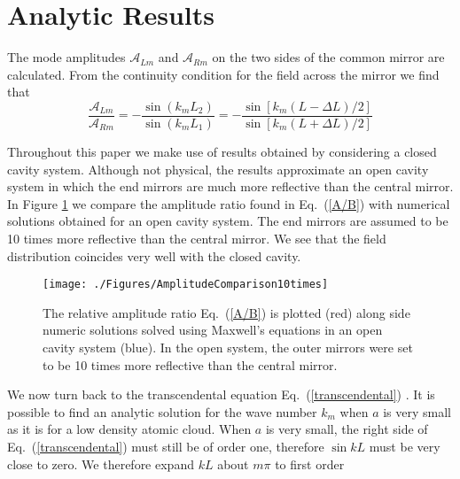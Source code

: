 \section{Analytic Results}
\label{sec:AnalyticExpressions}



The mode amplitudes $\mathcal{A}_{Lm}$ and $\mathcal{A}_{Rm}$ on the two sides of the common mirror are calculated.  From the continuity condition for the field across the mirror we find that   
\begin{equation}
\frac{\mathcal{A}_{Lm}}{\mathcal{A}_{Rm}}=-\frac{\sin(k_{m}L_{2})}{\sin(k_{m}L_{1})} = -\frac{\sin [k_{m} (L-\Delta L)/2]}{\sin[k_{m}(L+\Delta L)/2]} 
\label{A/B} 
\end{equation}

Throughout this paper we make use of results obtained by considering a closed cavity system.  Although not physical, the results approximate an open cavity system in which the end mirrors are much more reflective than the central mirror.   In  Figure \ref{fig:openvsclosed} we compare the amplitude ratio found in Eq.\ (\ref{A/B}) with numerical solutions obtained for an open cavity system.  The end mirrors are assumed to be 10 times more reflective than the central mirror. We see that the field distribution coincides very well with the closed cavity.


\begin{figure}
\texttt{[image: ./Figures/AmplitudeComparison10times]}
\caption{The relative amplitude ratio Eq.\ (\ref{A/B}) is plotted (red) along side numeric solutions solved using Maxwell's equations in an open cavity system (blue).  In the open system, the outer mirrors were set to be 10 times more reflective than the central mirror.}
\label{fig:openvsclosed}
\end{figure}

We now turn back to the transcendental equation Eq.\ (\ref{transcendental}) . It is possible to find an analytic solution for the wave number $k_{m}$ when $a$
is very small as it is for a low density atomic cloud. When $a$ is very small, the right side of Eq.\ (\ref{transcendental}) must still
be of order one, therefore $\sin kL$ must be very close to zero. We therefore expand $kL$ about $m\pi$ to first order 

